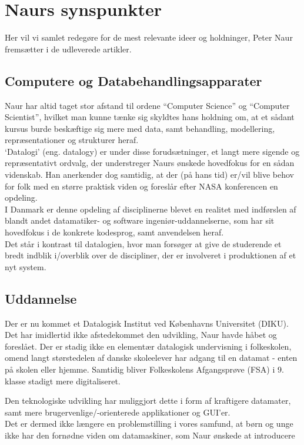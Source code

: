 \section{Naurs synspunkter}
Her vil vi samlet redegøre for de mest relevante ideer og holdninger, Peter Naur
fremsætter i de udleverede artikler.

\subsection{Computere og Databehandlingsapparater}
Naur har altid taget stor afstand til ordene ``Computer Science'' og ``Computer
Scientist'', hvilket man kunne tænke sig skyldtes hans holdning om, at et
sådant kursus burde beskæftige sig mere med data, samt behandling, modellering,
repræsentationer og strukturer heraf.\\
`Datalogi' (eng. datalogy) er under disse forudsætninger, et langt mere sigende
og repræsentativt ordvalg, der understreger Naurs ønskede hovedfokus for en
sådan videnskab.
Han anerkender dog samtidig, at der (på hans tid) er/vil blive behov for folk
med en større praktisk viden og foreslår efter NASA konferencen en opdeling.\\
I Danmark er denne opdeling af disciplinerne blevet en realitet med indførslen
af blandt andet datamatiker- og software ingeniør-uddannelserne, som har sit
hovedfokus i de konkrete kodesprog, samt anvendelsen heraf.\\
Det står i kontrast til datalogien, hvor man forsøger at give de studerende et
bredt indblik i/overblik over de discipliner, der er involveret i produktionen
af et nyt system.


\subsection{Uddannelse}
Der er nu kommet et Datalogisk Institut ved Københavns Universitet (DIKU). Det
har imidlertid ikke afstedekommet den udvikling, Naur havde håbet og foreslået.
Der er stadig ikke en elementær datalogisk undervisning i folkeskolen, omend
langt størstedelen af danske skoleelever har adgang til en datamat - enten på
skolen eller hjemme. Samtidig bliver Folkeskolens Afgangsprøve (FSA) i 9. klasse
stadigt mere digitaliseret.

Den teknologiske udvikling har muliggjort dette i form af kraftigere
datamater, samt mere brugervenlige/-orienterede applikationer og GUI'er.\\
Det er dermed ikke længere en problemstilling i vores samfund, at børn og unge
ikke har den fornødne viden om datamaskiner, som Naur ønskede at introducere

